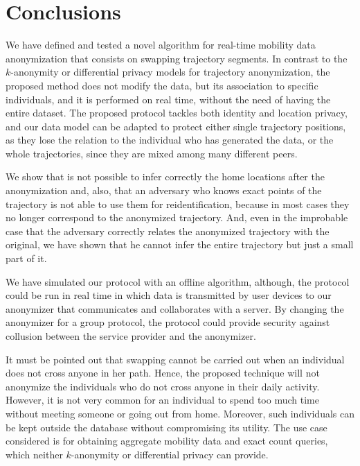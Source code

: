 \documentclass{llncs}
\begin{document}
\section{Conclusions}

We have defined and tested a novel algorithm for real-time mobility data \linebreak
anonymization that consists on swapping trajectory segments. In contrast to the $k$-anonymity or differential privacy models for trajectory anonymization, the proposed method does not modify the data, but its association to specific individuals, and it is performed on real time, without the need of having the entire dataset.
The proposed protocol tackles both identity and location privacy, 
 and our data model can be adapted to protect either single trajectory positions, as they lose the relation to the individual who has generated the data, or the whole trajectories, since they are mixed among many different peers.

We show that is not possible to infer correctly the home locations after the anonymization and, also, that an adversary who knows exact points of the trajectory is not able to use them for reidentification, because in most cases they no longer correspond to the anonymized trajectory. And, even in the improbable case that the adversary correctly relates the anonymized trajectory with the original, we have shown that he cannot infer the entire trajectory but just a small part of it.


We have simulated our protocol with an offline algorithm, although, the protocol could be run in real time in which data is transmitted by user devices to our anonymizer that communicates and collaborates with a server. By changing the anonymizer for a group protocol, the protocol could provide security against collusion between the service provider and the anonymizer.
%
%

It must be pointed out that swapping cannot be carried out when an individual does not cross anyone in her path. Hence, the proposed technique will not anonymize the individuals who do not cross anyone in their daily activity. 
However, it is not very common for an individual to spend too much time without meeting someone or going out from home. Moreover, such individuals can be kept outside the database without compromising its utility.  
The use case considered is for obtaining aggregate mobility data and exact count queries, which neither $k$-anonymity or differential privacy can provide.
\end{document}
